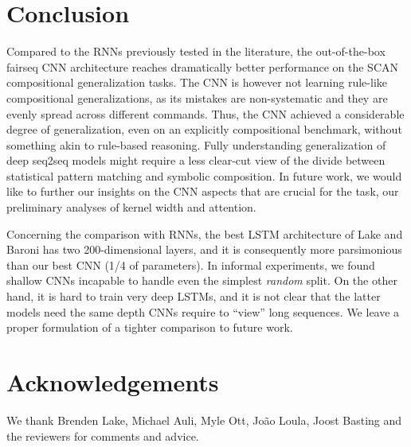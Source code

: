 \section{Conclusion}

Compared to the RNNs previously tested in the
literature, the out-of-the-box fairseq CNN architecture reaches
dramatically better performance on the SCAN compositional
generalization tasks. The CNN
is however not  learning rule-like compositional generalizations, as its
mistakes are non-systematic and they are evenly spread across different
commands. Thus, the CNN  achieved a considerable
degree of generalization, even on an explicitly compositional
benchmark, without something akin to rule-based reasoning. Fully
understanding generalization of deep seq2seq models might require a less
clear-cut view of the divide between statistical pattern matching and
symbolic composition. In future work, we would like to further our insights on the
CNN aspects that are crucial for the task,  our preliminary
analyses of kernel width and attention.

Concerning the comparison with RNNs, the best LSTM architecture of
Lake and Baroni has two 200-dimensional layers, and it is consequently
more parsimonious than our best CNN (1/4 of parameters). In informal
experiments, we found shallow CNNs incapable to handle even the
simplest \emph{random} split. On the other hand, it is hard to train
very deep LSTMs, and it is not clear that the latter models need the
same depth CNNs require to ``view'' long sequences. We
leave a proper formulation of a tighter comparison to future work.

\section*{Acknowledgements}
We thank Brenden Lake, Michael Auli, Myle Ott, João Loula, Joost Basting and the reviewers for comments and advice.
